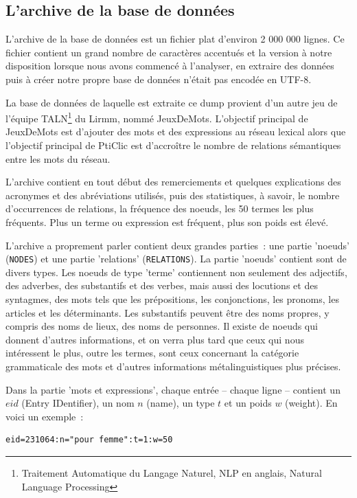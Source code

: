 \documentclass[a4paper,11pt,french]{article}
\begin{document}
\subsection{L'archive de la base de données}

L'archive de la base de données est un fichier plat d'environ 2 000 000 lignes. Ce fichier contient un grand nombre de caractères accentués et
la version à notre disposition lorsque nous avons commencé à l'analyser, en extraire des données puis à créer notre propre base de données
n'était pas encodée en UTF-8.

La base de données de laquelle est extraite ce dump provient d'un autre jeu de l'équipe TALN\footnote{Traitement Automatique du Langage Naturel, NLP en anglais, Natural Language Processing} du Lirmm, nommé JeuxDeMots. L'objectif principal de JeuxDeMots est d'ajouter des mots et des expressions au réseau lexical alors que l'objectif principal de PtiClic est d'accroître le nombre de relations sémantiques entre les mots du réseau.

L'archive contient en tout début des remerciements et quelques explications des acronymes et des abréviations utilisés, puis des statistiques, à savoir, le nombre d'occurrences de relations, la fréquence des noeuds, les 50 termes les plus fréquents. Plus un terme ou expression est fréquent, plus son poids est élevé. 

L'archive a proprement parler contient deux grandes parties~: une partie 'noeuds' (\verb!NODES!) et une partie 'relations' (\verb!RELATIONS!). La partie 'noeuds'  contient sont de divers types. Les noeuds de type 'terme' contiennent non seulement des adjectifs, des adverbes, des substantifs et des verbes, mais aussi des locutions et des syntagmes, des mots tels que les prépositions, les conjonctions, les pronoms, les articles et les déterminants. Les substantifs peuvent être des noms propres, y compris des noms de lieux, des noms de personnes. Il existe de noeuds qui donnent d'autres informations, et on verra plus tard que ceux qui nous intéressent le plus, outre les termes, sont ceux concernant la catégorie grammaticale des mots et d'autres informations métalinguistiques plus précises.

Dans la partie 'mots et expressions', chaque entrée -- chaque ligne -- contient un $eid$ (Entry IDentifier), un nom $n$ (name), un type $t$ et un poids $w$ (weight). En voici un exemple~:
\indent%
\begin{verbatim}
eid=231064:n="pour femme":t=1:w=50
\end{verbatim}
\end{document}
